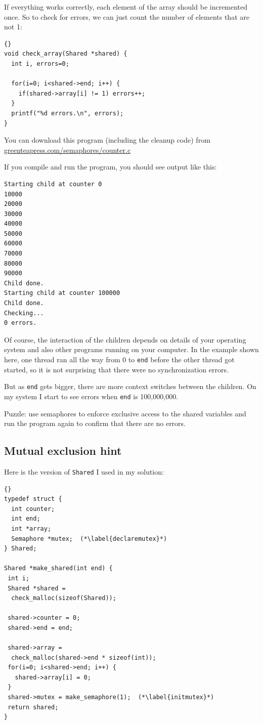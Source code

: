 \documentclass{book}
\begin{document}
If everything works correctly, each element of the array should be
incremented once.  So to check for errors, we can just count the
number of elements that are not 1:

\newpage
\begin{lstlisting}[title={}]{}
void check_array(Shared *shared) {
  int i, errors=0;

  for(i=0; i<shared->end; i++) {
    if(shared->array[i] != 1) errors++;
  }
  printf("%d errors.\n", errors);
}
\end{lstlisting}

You can download this program (including the cleanup code) from
\url{greenteapress.com/semaphores/counter.c}

If you compile and run the program, you should see output like this:

\begin{verbatim}
Starting child at counter 0
10000
20000
30000
40000
50000
60000
70000
80000
90000
Child done.
Starting child at counter 100000
Child done.
Checking...
0 errors.
\end{verbatim}

Of course, the interaction of the children depends on details
of your operating system and also other programs running on your
computer.  In the example shown here, one thread ran all the way
from 0 to {\tt end} before the other thread got started, so it is
not surprising that there were no synchronization errors.

But as {\tt end} gets bigger, there are more context switches between
the children.  On my system I start to see errors when
    {\tt end} is 100,000,000.

Puzzle: use semaphores to enforce exclusive access to the shared
variables and run the program again to confirm that there are
no errors.


\subsection{Mutual exclusion hint}

Here is the version of {\tt Shared} I used in my solution:

\newpage
\begin{lstlisting}[title={}]{}
typedef struct {
  int counter;
  int end;
  int *array;
  Semaphore *mutex;  (*\label{declaremutex}*)
} Shared;

Shared *make_shared(int end) {
 int i;
 Shared *shared = 
  check_malloc(sizeof(Shared));

 shared->counter = 0;
 shared->end = end;

 shared->array = 
  check_malloc(shared->end * sizeof(int));
 for(i=0; i<shared->end; i++) {
   shared->array[i] = 0;
 }
 shared->mutex = make_semaphore(1);  (*\label{initmutex}*)
 return shared;
}
\end{lstlisting}
\end{document}
